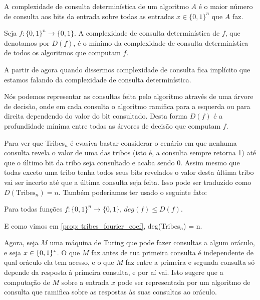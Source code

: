 \begin{defi}

A complexidade de consulta determinística de um algoritmo $A$ é o maior número de consulta aos bits da entrada sobre todas as entradas $x \in \{0, 1\}^{n}$ que $A$ faz.

Seja $f: \{0, 1\}^{n} \to \{0, 1\}$. A complexidade de consulta determinística de $f$, que denotamos por $D(f)$, é o mínimo da complexidade de consulta determinística de todos os algoritmos que computam $f$.

\end{defi}

A partir de agora quando dissermos complexidade de consulta fica implícito que estamos falando da complexidade de consulta determinística.

Nós podemos representar as consultas feita pelo algoritmo através de uma árvore de decisão, onde em cada consulta o algoritmo ramifica para a esquerda ou para direita dependendo do valor do bit consultado. Desta forma $D(f)$ é a profundidade mínima entre todas as árvores de decisão que computam $f$.

Para ver que Tribes$_{n}$ é evasiva bastar considerar o cenário em que nenhuma consulta revela o valor de uma das tribos (isto é, a consulta sempre retorna 1) até que o último bit da tribo seja consultado e acaba sendo 0. Assim mesmo que todas exceto uma tribo tenha todos seus bits revelados o valor desta última tribo vai ser incerto até que a última consulta seja feita. Isso pode ser traduzido como $D(\text{Tribes}_{n}) = n$. Também poderiamos ter usado o seguinte fato:

\begin{fato}
Para todas funções $f: \{0, 1\}^{n} \to \{0, 1\}$, $deg(f) \leq D(f)$.
\end{fato}

E como vimos em \ref{prop: tribes_fourier_coef}, deg(Tribes$_{n}$) = n.

Agora, seja $M$ uma máquina de Turing que pode fazer consultas a algum oráculo, e seja $x \in \{0, 1\}^{*}$. O que $M$ faz antes de tua primeira consulta é independente de qual oráculo ela tem acesso, e o que $M$ faz entre a primeira e segunda consulta só depende da resposta à primeira consulta, e por aí vai. Isto sugere que a computação de $M$ sobre a entrada $x$ pode ser representada por um algoritmo de consulta que ramifica sobre as respostas às suas consultas ao oráculo.


